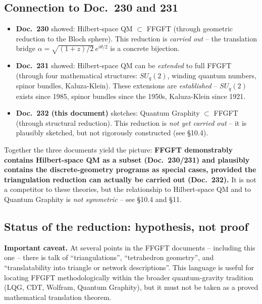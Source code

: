 \subsection{Connection to Doc.~230 and 231}

\begin{itemize}[leftmargin=2em,itemsep=2pt,topsep=2pt]
  \item \textbf{Doc.~230} showed: Hilbert-space QM $\subset$ FFGFT
        (through geometric reduction to the Bloch sphere). This
        reduction is \emph{carried out} -- the translation bridge
        $\alpha = \sqrt{(1+z)/2}\,e^{i\theta/2}$ is a concrete
        bijection.
  \item \textbf{Doc.~231} showed: Hilbert-space QM can be
        \emph{extended} to full FFGFT (through four mathematical
        structures: $SU_q(2)$, winding quantum numbers, spinor
        bundles, Kaluza-Klein). These extensions are
        \emph{established} -- $SU_q(2)$ exists since 1985, spinor
        bundles since the 1950s, Kaluza-Klein since 1921.
  \item \textbf{Doc.~232 (this document)} sketches: Quantum Graphity
        $\subset$ FFGFT (through structural reduction). This
        reduction is \emph{not yet carried out} -- it is plausibly
        sketched, but not rigorously constructed (see §10.4).
\end{itemize}

Together the three documents yield the picture: \textbf{FFGFT
demonstrably contains Hilbert-space QM as a subset (Doc.~230/231)
and plausibly contains the discrete-geometry programs as special
cases, provided the triangulation reduction can actually be carried
out (Doc.~232).} It is not a competitor to these theories, but the
relationship to Hilbert-space QM and to Quantum Graphity is
\emph{not symmetric} -- see §10.4 and §11.

\subsection{Status of the reduction: hypothesis, not proof}

\textbf{Important caveat.} At several points in the FFGFT documents
-- including this one -- there is talk of \enquote{triangulations},
\enquote{tetrahedron geometry}, and \enquote{translatability into
triangle or network descriptions}. This language is useful for
locating FFGFT methodologically within the broader quantum-gravity
tradition (LQG, CDT, Wolfram, Quantum Graphity), but it must not
be taken as a proved mathematical translation theorem.

